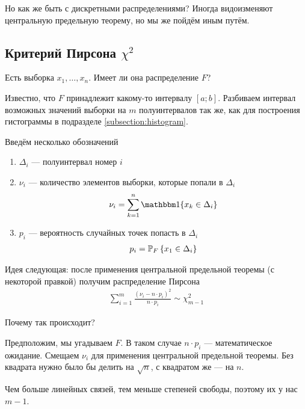 Но как же быть с дискретными распределениями? Иногда видоизменяют центральную
предельную теорему, но мы же пойдём иным путём.

\subsection{Критерий Пирсона $\chi^2$}

Есть выборка $x_1, \dots, x_n$. Имеет ли она распределение $F$?

Известно, что $F$ принадлежит какому-то интервалу $\left[ a; b \right]$.
Разбиваем интервал возможных значений выборки на $m$ полуинтервалов
так же, как для построения гистограммы в подразделе \ref{subsection:histogram}.

Введём несколько обозначений
\begin{enumerate}
    \item $\Delta_i$ --- полуинтервал номер $i$
    \item $\nu_i$ --- количество элементов выборки, которые попали в $\Delta_i$
        \begin{align*}
            \nu_i = \sum_{k=1}^{n} \Indicator{x_k \in \Delta_i}
        \end{align*}
    \item $p_i$ --- вероятность случайных точек попасть в $\Delta_i$
        \begin{align*}
            p_i = \Probability[F]{x_1 \in \Delta_i}
        \end{align*}
\end{enumerate}

Идея следующая: после применения центральной предельной теоремы (с некоторой
правкой) получим распределение Пирсона
\begin{align*}
    \sum_{i=1}^{m}\frac{\left( \nu_i - n \cdot p_i \right)^2}{n \cdot p_i}
    \sim \chi_{m-1}^2
\end{align*}

Почему так происходит?

Предположим, мы угадываем $F$. В таком случае $n \cdot p_i$ --- математическое
ожидание. Смещаем $\nu_i$ для применения центральной предельной теоремы.
Без квадрата нужно было бы делить на $\sqrt{n}$, с квадратом же --- на $n$.

Чем больше линейных связей, тем меньше степеней свободы, поэтому их у нас $m-1$.

